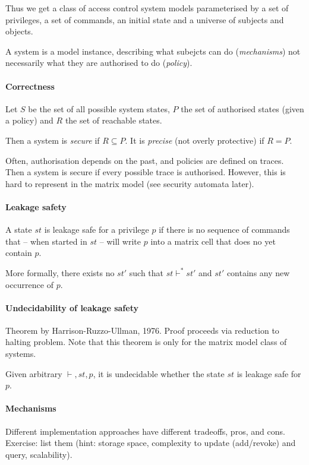 \mbox{} %

Thus we get a class of access control system models parameterised by a set of privileges, a set of commands, an initial state and a universe of subjects and objects.

A system is a model instance, describing what subejcts can do (\emph{mechanisms}) not necessarily what they are authorised to do (\emph{policy}).

\paragraph{Correctness} Let $S$ be the set of all possible system states, $P$ the set of authorised states (given a policy) and $R$ the set of reachable states.

Then a system is \emph{secure} if $R \subseteq P$. It is \emph{precise} (not overly protective) if $R=P$.

Often, authorisation depends on the past, and policies are defined on traces. Then a system is secure if every possible trace is authorised. However, this is hard to represent in the matrix model (see security automata later).

\paragraph{Leakage safety} A state $st$ is leakage safe for a privilege $p$ if there is no sequence of commands that -- when started in $st$ -- will write $p$ into a matrix cell that does no yet contain $p$.

More formally, there exists no $st'$ such that $st \vdash^* st'$ and $st'$ contains any new occurrence of $p$.

\paragraph{Undecidability of leakage safety} Theorem by Harrison-Ruzzo-Ullman, 1976. Proof proceeds via reduction to halting problem. Note that this theorem is only for the matrix model class of systems.

\begin{center}
    Given arbitrary $\vdash, st, p$, it is undecidable whether the state $st$ is leakage safe for $p$.
\end{center}

\paragraph{Mechanisms} Different implementation approaches have different tradeoffs, pros, and cons. \\
Exercise: list them (hint: storage space, complexity to update (add/revoke) and query, scalability).

